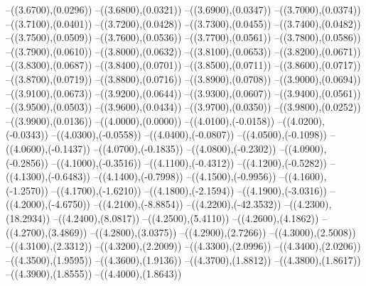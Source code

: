 {	--({\sx*(3.6700)},{\sy*(0.0296)})
	--({\sx*(3.6800)},{\sy*(0.0321)})
	--({\sx*(3.6900)},{\sy*(0.0347)})
	--({\sx*(3.7000)},{\sy*(0.0374)})
	--({\sx*(3.7100)},{\sy*(0.0401)})
	--({\sx*(3.7200)},{\sy*(0.0428)})
	--({\sx*(3.7300)},{\sy*(0.0455)})
	--({\sx*(3.7400)},{\sy*(0.0482)})
	--({\sx*(3.7500)},{\sy*(0.0509)})
	--({\sx*(3.7600)},{\sy*(0.0536)})
	--({\sx*(3.7700)},{\sy*(0.0561)})
	--({\sx*(3.7800)},{\sy*(0.0586)})
	--({\sx*(3.7900)},{\sy*(0.0610)})
	--({\sx*(3.8000)},{\sy*(0.0632)})
	--({\sx*(3.8100)},{\sy*(0.0653)})
	--({\sx*(3.8200)},{\sy*(0.0671)})
	--({\sx*(3.8300)},{\sy*(0.0687)})
	--({\sx*(3.8400)},{\sy*(0.0701)})
	--({\sx*(3.8500)},{\sy*(0.0711)})
	--({\sx*(3.8600)},{\sy*(0.0717)})
	--({\sx*(3.8700)},{\sy*(0.0719)})
	--({\sx*(3.8800)},{\sy*(0.0716)})
	--({\sx*(3.8900)},{\sy*(0.0708)})
	--({\sx*(3.9000)},{\sy*(0.0694)})
	--({\sx*(3.9100)},{\sy*(0.0673)})
	--({\sx*(3.9200)},{\sy*(0.0644)})
	--({\sx*(3.9300)},{\sy*(0.0607)})
	--({\sx*(3.9400)},{\sy*(0.0561)})
	--({\sx*(3.9500)},{\sy*(0.0503)})
	--({\sx*(3.9600)},{\sy*(0.0434)})
	--({\sx*(3.9700)},{\sy*(0.0350)})
	--({\sx*(3.9800)},{\sy*(0.0252)})
	--({\sx*(3.9900)},{\sy*(0.0136)})
	--({\sx*(4.0000)},{\sy*(0.0000)})
	--({\sx*(4.0100)},{\sy*(-0.0158)})
	--({\sx*(4.0200)},{\sy*(-0.0343)})
	--({\sx*(4.0300)},{\sy*(-0.0558)})
	--({\sx*(4.0400)},{\sy*(-0.0807)})
	--({\sx*(4.0500)},{\sy*(-0.1098)})
	--({\sx*(4.0600)},{\sy*(-0.1437)})
	--({\sx*(4.0700)},{\sy*(-0.1835)})
	--({\sx*(4.0800)},{\sy*(-0.2302)})
	--({\sx*(4.0900)},{\sy*(-0.2856)})
	--({\sx*(4.1000)},{\sy*(-0.3516)})
	--({\sx*(4.1100)},{\sy*(-0.4312)})
	--({\sx*(4.1200)},{\sy*(-0.5282)})
	--({\sx*(4.1300)},{\sy*(-0.6483)})
	--({\sx*(4.1400)},{\sy*(-0.7998)})
	--({\sx*(4.1500)},{\sy*(-0.9956)})
	--({\sx*(4.1600)},{\sy*(-1.2570)})
	--({\sx*(4.1700)},{\sy*(-1.6210)})
	--({\sx*(4.1800)},{\sy*(-2.1594)})
	--({\sx*(4.1900)},{\sy*(-3.0316)})
	--({\sx*(4.2000)},{\sy*(-4.6750)})
	--({\sx*(4.2100)},{\sy*(-8.8854)})
	--({\sx*(4.2200)},{\sy*(-42.3532)})
	--({\sx*(4.2300)},{\sy*(18.2934)})
	--({\sx*(4.2400)},{\sy*(8.0817)})
	--({\sx*(4.2500)},{\sy*(5.4110)})
	--({\sx*(4.2600)},{\sy*(4.1862)})
	--({\sx*(4.2700)},{\sy*(3.4869)})
	--({\sx*(4.2800)},{\sy*(3.0375)})
	--({\sx*(4.2900)},{\sy*(2.7266)})
	--({\sx*(4.3000)},{\sy*(2.5008)})
	--({\sx*(4.3100)},{\sy*(2.3312)})
	--({\sx*(4.3200)},{\sy*(2.2009)})
	--({\sx*(4.3300)},{\sy*(2.0996)})
	--({\sx*(4.3400)},{\sy*(2.0206)})
	--({\sx*(4.3500)},{\sy*(1.9595)})
	--({\sx*(4.3600)},{\sy*(1.9136)})
	--({\sx*(4.3700)},{\sy*(1.8812)})
	--({\sx*(4.3800)},{\sy*(1.8617)})
	--({\sx*(4.3900)},{\sy*(1.8555)})
	--({\sx*(4.4000)},{\sy*(1.8643)})
}
